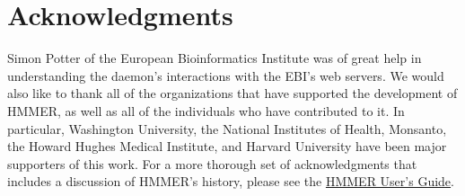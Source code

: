 \documentclass[notoc,justified,openany]{tufte-book}    %
\begin{document}
\chapter{Acknowledgments}
Simon Potter of the European Bioinformatics Institute was of great help in understanding the daemon's interactions with the EBI's web servers.  We would also like to thank all of the organizations that have supported the development of HMMER, as well as all of the individuals who have contributed to it. In particular, Washington University, the National Institutes of Health, Monsanto, the Howard Hughes Medical Institute, and Harvard University have been major supporters of this work.  For a more thorough set of acknowledgments that includes a discussion of HMMER's history, please see the \underline{HMMER User's Guide}.

\label{manualend}

% 
\end{document}
